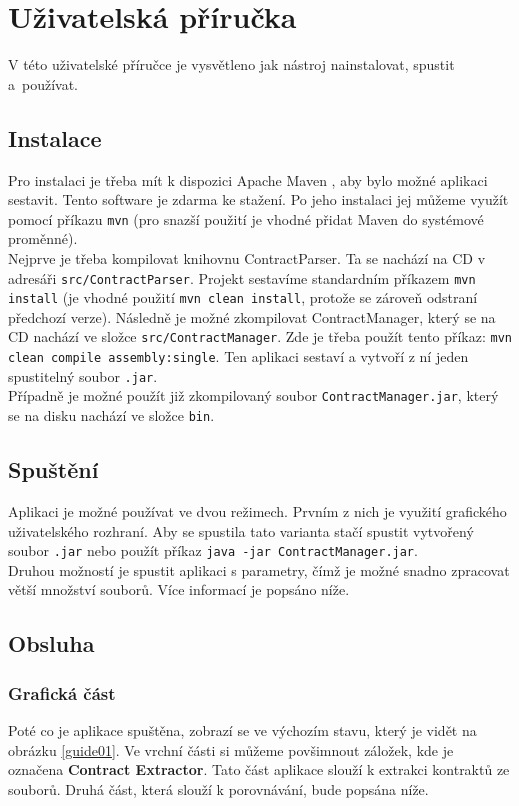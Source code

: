 \chapter{Uživatelská příručka}	
	V této uživatelské příručce je vysvětleno jak nástroj nainstalovat, spustit a~používat.
	
	\section{Instalace}
		Pro instalaci je třeba mít k dispozici Apache Maven \cite{maven}, aby bylo možné aplikaci sestavit. Tento software je zdarma ke stažení. Po jeho instalaci jej můžeme využít pomocí příkazu \texttt{mvn} (pro snazší použití je vhodné přidat Maven do systémové proměnné).\\
		
		Nejprve je třeba kompilovat knihovnu ContractParser. Ta se nachází na CD v adresáři \texttt{src/ContractParser}. Projekt sestavíme standardním příkazem \texttt{mvn install} (je vhodné použití \texttt{mvn clean install}, protože se zároveň odstraní předchozí verze). Následně je možné zkompilovat ContractManager, který se na CD nachází ve složce \texttt{src/ContractManager}. Zde je třeba použít tento příkaz: \texttt{mvn clean compile assembly:single}. Ten aplikaci sestaví a vytvoří z ní jeden spustitelný soubor \texttt{.jar}.\\
		
		Případně je možné použít již zkompilovaný soubor \texttt{ContractManager.jar}, který se na disku nachází ve složce \texttt{bin}.
	
	\section{Spuštění}
		Aplikaci je možné používat ve dvou režimech. Prvním z nich je využití grafického uživatelského rozhraní. Aby se spustila tato varianta stačí spustit vytvořený soubor \texttt{.jar} nebo použít příkaz \texttt{java -jar ContractManager.jar}.\\
		
		Druhou možností je spustit aplikaci s parametry, čímž je možné snadno zpracovat větší množství souborů. Více informací je popsáno níže.
	
	\section{Obsluha}
	
		\subsection{Grafická část}
			Poté co je aplikace spuštěna, zobrazí se ve výchozím stavu, který je vidět na obrázku \ref{guide01}. Ve vrchní části si můžeme povšimnout záložek, kde je označena \textbf{Contract Extractor}. Tato část aplikace slouží k extrakci kontraktů ze souborů. Druhá část, která slouží k porovnávání, bude popsána níže.
			
